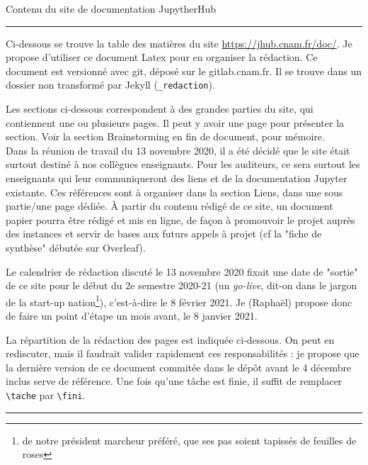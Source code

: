 \documentclass[a4paper, 12pt]{article}
\newcommand{\cmark}{\ding{51}}%
\newcommand{\done}{{\color{OliveGreen}\rlap{$\square$}{\raisebox{2pt}{\large\hspace{1pt}\cmark}}}%
\hspace{-2.5pt}}
\newcommand{\todosquare}{{\color{Red}{\boldmath $\square$}}}
\newcommand{\tache}[1]{
\mdfsetup{linecolor=Red, linewidth=2pt, roundcorner=5pt }
  \begin{flushright}
    \begin{minipage}{4cm}
  \begin{mdframed}
    \begin{itemize}
      \item[\todosquare] \textbf{#1}
    \end{itemize}
  \end{mdframed}
    \end{minipage}
  \end{flushright}
}
\newcommand{\fini}[1]{
\mdfsetup{linecolor=OliveGreen, linewidth=2pt, roundcorner=5pt }
  \begin{flushright}
    \begin{minipage}{4cm}
  \begin{mdframed}
    \begin{itemize}
      \item[\done] \textbf{#1}
    \end{itemize}
  \end{mdframed}
    \end{minipage}
  \end{flushright}
}
\begin{document}
\begin{center}
  {\Large Contenu du site de documentation JupytherHub}\\[3ex]
\end{center}

\begin{center}
\rule{.5\textwidth}{1pt}
\end{center}

Ci-dessous se trouve la table des matières du site
\url{https://jhub.cnam.fr/doc/}. Je propose d'utiliser ce document Latex pour
en organiser la rédaction. Ce document est versionné avec git, déposé sur le
gitlab.cnam.fr. Il se trouve dans un dossier non transformé par Jekyll
(\verb+_redaction+). 

Les sections ci-dessous correspondent à des grandes parties du site, qui
contiennent une ou plusieurs pages. Il peut y avoir une page pour présenter la
section. Voir la section Brainstorming en fin de document, pour mémoire.\\

Dans la réunion de travail du 13 novembre 2020, il a été décidé que le site
était surtout destiné à nos collègues enseignants. Pour les auditeurs, ce sera
surtout les enseignants qui leur communiqueront des liens et de la documentation
Jupyter existante. Ces références sont à organiser dans la section Liens, dans
une sous partie/une page dédiée. À partir du contenu rédigé de ce site, un
document papier pourra être rédigé et mis en ligne, de façon à promouvoir le
projet auprès des instances et servir de bases aux futurs appels à projet (cf la
"fiche de synthèse" débutée sur Overleaf).

Le calendrier de rédaction discuté le 13 novembre 2020 fixait une date de
"sortie" de ce site pour le début du 2e semestre 2020-21 (un {\em go-live},
dit-on dans le jargon de la start-up nation\footnote{de notre président marcheur
préféré, que ses pas soient tapissés de feuilles de roses}), c'est-à-dire le 8
février 2021. Je (Raphaël) propose donc de faire un point d'étape un mois avant, le 8
janvier 2021.

La répartition de la rédaction des pages est indiquée ci-dessous. On peut en
rediscuter, mais il faudrait valider rapidement ces responsabilités : je propose
que la dernière version de ce document commitée dans le dépôt avant le 4
décembre inclus serve de référence. Une fois qu'une tâche est finie, il suffit
de remplacer \verb+\tache+ par \verb+\fini+.

\begin{center}
\rule{.5\textwidth}{1pt}
\end{center}
\end{document}
